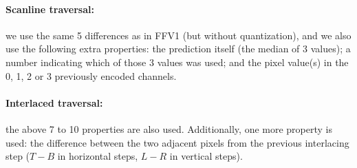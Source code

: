 \documentclass{article}
\begin{document}
\noindent
\paragraph{Scanline traversal:}
we use the same 5 differences as in %
FFV1 (but without quantization),
and we also use the following extra properties:
the prediction itself (the median of 3 values);
a number indicating which of those 3 values was used;
and the pixel value(s) in the 0, 1, 2 or 3 previously encoded channels.

\noindent
\paragraph{Interlaced traversal:}
the above 7 to 10 properties are also used.
Additionally, one more property is used: the
difference between the two adjacent pixels from the previous interlacing step
($T-B$ in horizontal steps, $L-R$ in vertical steps).


\end{document}
